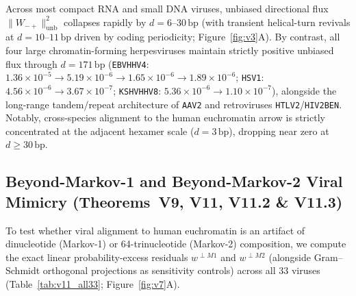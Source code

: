 \documentclass[11pt, a4paper]{article}
\DeclareRobustCommand{\_}{\textunderscore\allowbreak}
\begin{document}
Across most compact RNA and small DNA viruses, unbiased directional flux $\|W_{-+}\|^2_{\mathrm{unb}}$ collapses rapidly by $d = 6\text{--}30\,\mathrm{bp}$ (with transient helical-turn revivals at $d = 10\text{--}11\,\mathrm{bp}$ driven by coding periodicity; Figure~\ref{fig:v3}A). By contrast, all four large chromatin-forming herpesviruses maintain strictly positive unbiased flux through $d = 171\,\mathrm{bp}$ (\texttt{EBV\_HHV4}: $1.36 \times 10^{-5} \to 5.19 \times 10^{-6} \to 1.65 \times 10^{-6} \to 1.89 \times 10^{-6}$; \texttt{HSV1}: $4.56 \times 10^{-6} \to 3.67 \times 10^{-7}$; \texttt{KSHV\_HHV8}: $5.36 \times 10^{-6} \to 1.10 \times 10^{-7}$), alongside the long-range tandem/repeat architecture of \texttt{AAV2} and retroviruses \texttt{HTLV2}/\texttt{HIV2\_BEN}. Notably, cross-species alignment to the human euchromatin arrow is strictly concentrated at the adjacent hexamer scale ($d = 3\,\mathrm{bp}$), dropping near zero at $d \ge 30\,\mathrm{bp}$.

\subsection{Beyond-Markov-1 and Beyond-Markov-2 Viral Mimicry (Theorems~V9, V11, V11.2 \& V11.3)}

To test whether viral alignment to human euchromatin is an artifact of dinucleotide (Markov-1) or 64-trinucleotide (Markov-2) composition, we compute the exact linear probability-excess residuals $w^{\perp M1}$ and $w^{\perp M2}$ (alongside Gram--Schmidt orthogonal projections as sensitivity controls) across all 33 viruses (Table~\ref{tab:v11_all33}; Figure~\ref{fig:v7}A).
\end{document}
